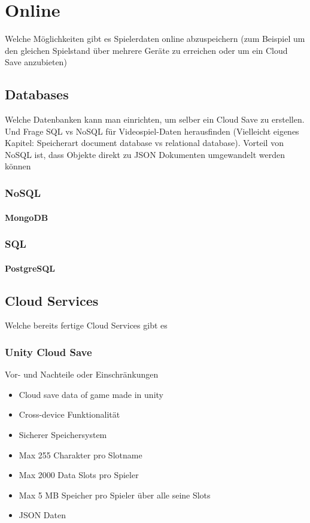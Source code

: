 \chapter{Online}\label{ch:online}
Welche Möglichkeiten gibt es Spielerdaten online abzuspeichern (zum Beispiel um den gleichen Spielstand über mehrere Geräte zu erreichen oder um ein Cloud Save anzubieten)

\section{Databases}
Welche Datenbanken kann man einrichten, um selber ein Cloud Save zu erstellen. Und Frage SQL vs NoSQL für Videospiel-Daten herausfinden (Vielleicht eigenes Kapitel: Speicherart document database vs relational database). Vorteil von NoSQL ist, dass Objekte direkt zu JSON Dokumenten umgewandelt werden können

\subsection{NoSQL}
\subsubsection{MongoDB}

\subsection{SQL}
\subsubsection{PostgreSQL}

\section{Cloud Services}
Welche bereits fertige Cloud Services gibt es

\subsection{Unity Cloud Save} 
Vor- und Nachteile oder Einschränkungen\\

\begin{itemize}
    \item Cloud save data of game made in unity
    \item Cross-device Funktionalität
    \item Sicherer Speichersystem
    \item Max 255 Charakter pro Slotname
    \item Max 2000 Data Slots pro Spieler
    \item Max 5 MB Speicher pro Spieler über alle seine Slots
    \item JSON Daten
\end{itemize}

